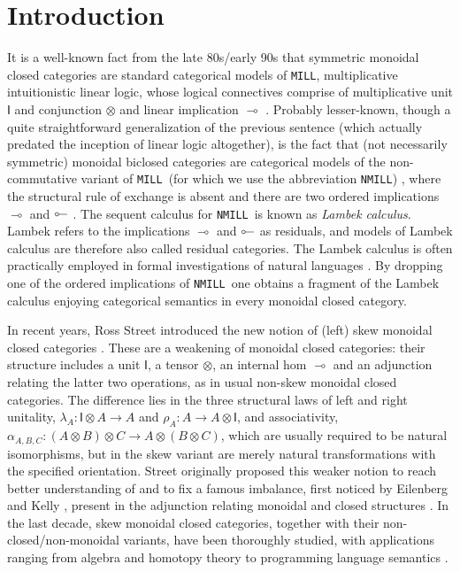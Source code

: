 \documentclass[copyright,creativecommons]{eptcs}
\theoremstyle{definition}
\newcommand{\ot}{\otimes}
\newcommand{\lolli}{\multimap}
\newcommand{\illol}{\rotatebox[origin=c]{180}{$\multimap$}}
\newcommand{\I}{\mathsf{I}}
\newcommand{\MILL}{\texttt{MILL}}
\newcommand{\NMILL}{\texttt{NMILL}}
\begin{document}
\section{Introduction}
It is a well-known fact from the late 80s/early 90s that symmetric monoidal closed categories are standard categorical models of \MILL, multiplicative intuitionistic linear logic, whose logical connectives comprise of multiplicative unit $\I$ and conjunction $\ot$ and linear implication $\lolli$ \cite{mellies:categorical:09}. Probably lesser-known, though a quite straightforward generalization of the previous sentence (which actually predated the inception of linear logic altogether), is the fact that (not necessarily symmetric) monoidal biclosed categories are categorical models of the non-commutative variant of \MILL\ (for which we use the abbreviation \NMILL) \cite{abrusci:noncommutative:1990}, where the structural rule of exchange is absent and there are two ordered implications $\lolli$ and $\illol$ \cite{lambek:deductive:68}. The sequent calculus for \NMILL\ is known as \emph{Lambek calculus}. Lambek refers to the implications $\lolli$ and $\illol$ as residuals, and models of Lambek calculus are therefore also called residual categories. The Lambek calculus is often practically employed in formal investigations of natural languages \cite{lambek:mathematics:58}.
By dropping one of the ordered implications of \NMILL\ one obtains a fragment of the Lambek calculus enjoying categorical semantics in every monoidal closed category.

In recent years, Ross Street introduced the new notion of (left) skew monoidal closed categories \cite{street:skew-closed:2013}. These are a weakening of monoidal closed categories: their structure includes a unit $\I$, a tensor $\ot$, an internal hom $\lolli$ and an adjunction relating the latter two operations, as in usual non-skew monoidal closed categories. The difference lies in the three structural laws of left and right unitality, $\lambda_A : \I \ot A \to A$ and $\rho_A : A \to A \ot \I$, and associativity, $\alpha_{A,B,C} : (A \ot B) \ot C \to A \ot (B \ot C)$, which are usually required to be natural isomorphisms, but in the skew variant are merely natural transformations with the specified orientation. Street originally proposed this weaker notion to reach better understanding of and to fix a famous imbalance, first noticed by Eilenberg and Kelly \cite{eilenberg:closed:1966}, present in the adjunction relating monoidal and closed structures \cite{street:skew-closed:2013,uustalu:eilenberg-kelly:2020}. In the last decade, skew monoidal closed categories, together with their non-closed/non-monoidal variants, have been thoroughly studied, with applications ranging from algebra and homotopy theory to programming language semantics \cite{szlachanyi:skew-monoidal:2012,lack:skew:2012,lack:triangulations:2014,altenkirch:monads:2014,buckley:catalan:2015,bourke:skew:2017,bourke:skew:2018,tomita:realizability:21}.
\end{document}

